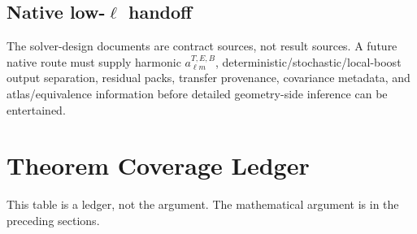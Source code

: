 \documentclass[11pt]{article}
\begin{document}
\subsection{Native low-\(\ell\) handoff}
The solver-design documents are contract sources, not result sources.  A future native route must supply harmonic \(a_{\ell m}^{T,E,B}\), deterministic/stochastic/local-boost output separation, residual packs, transfer provenance, covariance metadata, and atlas/equivalence information before detailed geometry-side inference can be entertained.

\section{Theorem Coverage Ledger}
This table is a ledger, not the argument.  The mathematical argument is in the preceding sections.
\end{document}
